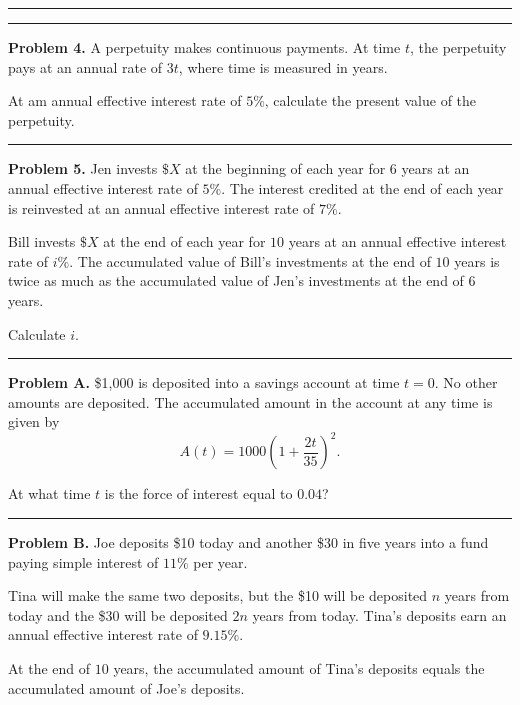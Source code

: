 \documentclass[11pt]{article}
\begin{document}
\medskip
\hrule






\newpage

\hrule

\medskip

\textbf{Problem 4.} A perpetuity makes continuous payments. At time $t$, the perpetuity pays at an annual rate of $3t$, where time is measured in years. 

At am annual effective interest rate of $5\%$, calculate the present value of the perpetuity.

\medskip

\hrule

\medskip

\textbf{Problem 5.} Jen invests $\$X$ at the beginning of each year for $6$ years at an annual effective interest rate of $5\%$. The interest credited at the end of each year is reinvested at an annual effective interest rate of $7\%$.

Bill invests $\$X$ at the end of each year for $10$ years at an annual effective interest rate of $i\%$. The accumulated value of Bill's investments at the end of $10$ years is twice as much as the accumulated value of Jen's investments at the end of $6$ years.

Calculate $i$.

\medskip
\hrule


\medskip

\newpage

\textbf{Problem A.} \$1{,}000 is deposited into a savings account at time $t=0$. No other amounts are deposited. The accumulated amount in the account at any time is given by
\[
A(t) = 1000\left(1 + \frac{2t}{35}\right)^2.
\]

At what time $t$ is the force of interest equal to $0.04$?

\medskip

\hrule

\medskip

\textbf{Problem B.} Joe deposits \$10 today and another \$30 in five years into a fund paying simple interest of $11\%$ per year.

Tina will make the same two deposits, but the \$10 will be deposited $n$ years from today and the \$30 will be deposited $2n$ years from today. Tina's deposits earn an annual effective interest rate of $9.15\%$.

At the end of $10$ years, the accumulated amount of Tina's deposits equals the accumulated amount of Joe's deposits.
\end{document}
